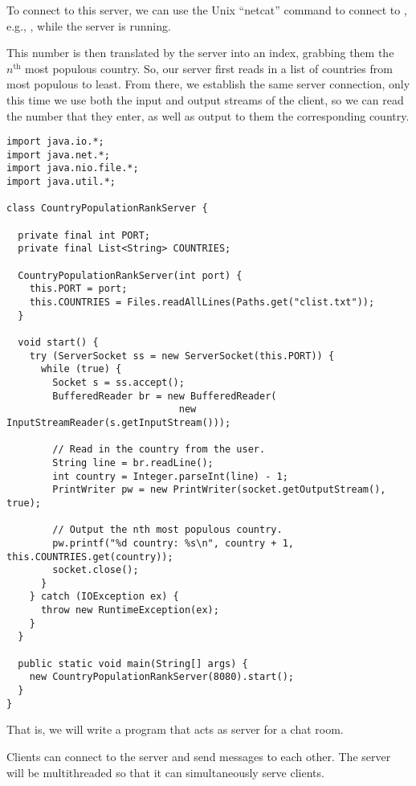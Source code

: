 To connect to this server, we can use the Unix  ``netcat'' command to connect to , e.g., , while the server is running.

This number is then translated by the server into an index, grabbing them the~$n^{\text{th}}$ most populous country. 
So, our server first reads in a list of countries from most populous to least. 
From there, we establish the same server connection, only this time we use both the input and output streams of the client, so we can read the number that they enter, as well as output to them the corresponding country.

\begin{lstlisting}[language=MyJava]
import java.io.*;
import java.net.*;
import java.nio.file.*;
import java.util.*;

class CountryPopulationRankServer {

  private final int PORT;
  private final List<String> COUNTRIES;

  CountryPopulationRankServer(int port) {
    this.PORT = port;
    this.COUNTRIES = Files.readAllLines(Paths.get("clist.txt"));
  }

  void start() {
    try (ServerSocket ss = new ServerSocket(this.PORT)) {
      while (true) {
        Socket s = ss.accept();
        BufferedReader br = new BufferedReader(
                              new InputStreamReader(s.getInputStream()));
        
        // Read in the country from the user.
        String line = br.readLine();
        int country = Integer.parseInt(line) - 1;
        PrintWriter pw = new PrintWriter(socket.getOutputStream(), true);

        // Output the nth most populous country.
        pw.printf("%d country: %s\n", country + 1, this.COUNTRIES.get(country));
        socket.close();
      }
    } catch (IOException ex) { 
      throw new RuntimeException(ex);
    }
  }

  public static void main(String[] args) {
    new CountryPopulationRankServer(8080).start();
  }
}
\end{lstlisting}

That is, we will write a program that acts as server for a chat room. 

Clients can connect to the server and send messages to each other. 
The server will be multithreaded so that it can simultaneously serve clients. 


